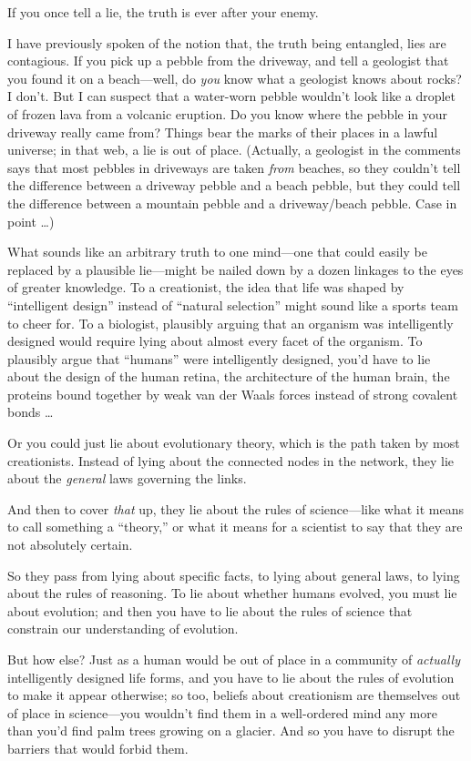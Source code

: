 {
 If you once tell a lie, the truth is ever after your enemy. }

{
 I have previously spoken of the notion that, the truth being
entangled, lies are contagious. If you pick up a pebble from the
driveway, and tell a geologist that you found it on a beach---well, do
\textit{you} know what a geologist knows about rocks? I
don't. But I can suspect that a water-worn pebble
wouldn't look like a droplet of frozen lava from a
volcanic eruption. Do you know where the pebble in your driveway really
came from? Things bear the marks of their places in a lawful universe;
in that web, a lie is out of place. (Actually, a geologist in the
comments says that most pebbles in driveways are taken \textit{from}
beaches, so they couldn't tell the difference between a
driveway pebble and a beach pebble, but they could tell the difference
between a mountain pebble and a driveway/beach pebble. Case in point
\ldots)}

{
 What sounds like an arbitrary truth to one mind---one that could
easily be replaced by a plausible lie---might be nailed down by a dozen
linkages to the eyes of greater knowledge. To a creationist, the idea
that life was shaped by ``intelligent
design'' instead of ``natural
selection'' might sound like a sports team to cheer
for. To a biologist, plausibly arguing that an organism was
intelligently designed would require lying about almost every facet of
the organism. To plausibly argue that
``humans'' were intelligently
designed, you'd have to lie about the design of the
human retina, the architecture of the human brain, the proteins bound
together by weak van der Waals forces instead of strong covalent bonds
\ldots}

{
 Or you could just lie about evolutionary theory, which is the path
taken by most creationists. Instead of lying about the connected nodes
in the network, they lie about the \textit{general} laws governing the
links.}

{
 And then to cover \textit{that} up, they lie about the rules of
science---like what it means to call something a
``theory,'' or what it means for a
scientist to say that they are not absolutely certain.}

{
 So they pass from lying about specific facts, to lying about
general laws, to lying about the rules of reasoning. To lie about
whether humans evolved, you must lie about evolution; and then you have
to lie about the rules of science that constrain our understanding of
evolution.}

{
 But how else? Just as a human would be out of place in a community
of \textit{actually} intelligently designed life forms, and you have to
lie about the rules of evolution to make it appear otherwise; so too,
beliefs about creationism are themselves out of place in science---you
wouldn't find them in a well-ordered mind any more than
you'd find palm trees growing on a glacier. And so you
have to disrupt the barriers that would forbid them.}

